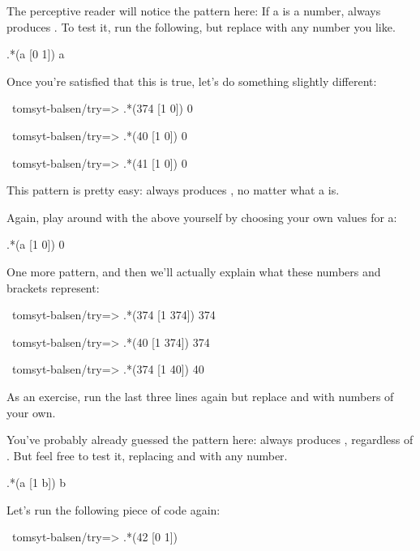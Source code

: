 The perceptive reader will notice the pattern here: If a is a number,  always produces . To test it, run the following, but
replace  with any number you like. 

\begin{code}
.*(a [0 1])
a
\end{code}

Once you're satisfied that this is true, let's do something slightly
different:

\begin{code}
~tomsyt-balsen/try=> .*(374 [1 0])
0

~tomsyt-balsen/try=> .*(40 [1 0])
0

~tomsyt-balsen/try=> .*(41 [1 0])
0
\end{code}

This pattern is pretty easy:  always produces , no matter what a
is.

Again, play around with the above yourself by choosing your own values for a: 

\begin{code}
.*(a [1 0])
0
\end{code}

One more pattern, and then we'll actually explain what these numbers and brackets represent:

\begin{code}
~tomsyt-balsen/try=> .*(374 [1 374])
374

~tomsyt-balsen/try=> .*(40 [1 374])
374

~tomsyt-balsen/try=> .*(374 [1 40])
40
\end{code}

As an exercise, run the last three lines again but replace  and  with
numbers of your own.

You've probably already guessed the pattern here:  always produces
, regardless of . But feel free to test it, replacing  and  with any number. 

\begin{code}
.*(a [1 b])
b
\end{code}

Let's run the following piece of code again:

\begin{code}
~tomsyt-balsen/try=> .*(42 [0 1])
\end{code}

